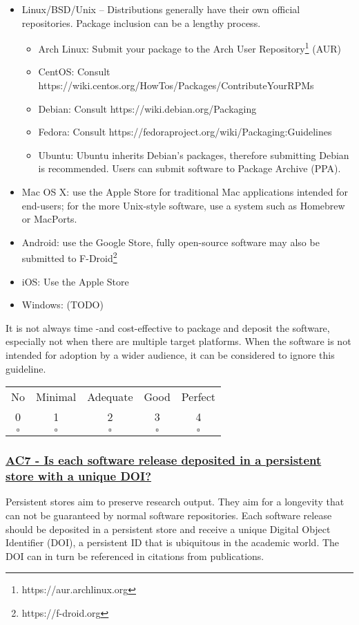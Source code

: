 \documentclass[a4paper,11pt]{article}
\newcommand{\criterion}[2]{\subsubsection*{\underline{#1 - #2}}\label{id:#1}}
\newcommand\CheckTable{%
  \begin{tabular}{ccccc}
    No & Minimal & Adequate & Good & Perfect \\
    0 & 1 & 2 & 3 & 4 \\
    \hline
    $\square$ & $\square$ & $\square$ & $\square$ & $\square$ \\
  \end{tabular}%
}
\begin{document}
\begin{itemize}
    \item Linux/BSD/Unix -- Distributions generally have their own official repositories. Package inclusion can be a lengthy process.
    \begin{itemize}
        \item Arch Linux: Submit your package to the Arch User Repository\footnote{https://aur.archlinux.org} (AUR)
		\item CentOS: Consult https://wiki.centos.org/HowTos/Packages/ContributeYourRPMs
        \item Debian: Consult https://wiki.debian.org/Packaging
        \item Fedora: Consult https://fedoraproject.org/wiki/Packaging:Guidelines
        \item Ubuntu: Ubuntu inherits Debian's packages, therefore submitting Debian is recommended. Users can submit software  to Package Archive (PPA).
    \end{itemize}
    \item Mac OS X: use the Apple Store for traditional Mac applications intended for end-users; for the more Unix-style
        software, use a system such as Homebrew or MacPorts.
    \item Android: use the Google Store, fully open-source software may also be submitted to F-Droid\footnote{https://f-droid.org}
    \item iOS: Use the Apple Store
    \item Windows: (TODO) 
\end{itemize}

It is not always time -and cost-effective to package and deposit the software,
especially not when there are multiple target platforms. When the software is
not intended for adoption by a wider audience, it can be considered to ignore
this guideline.

\CheckTable

\newcommand{\acSevenID}{AC7}
\newcommand{\acSevenText}{Is each software release deposited in a persistent store with a unique DOI?}
\criterion{\acSevenID}{\acSevenText}

Persistent stores aim to preserve research output. They aim for a longevity
that can not be guaranteed by normal software repositories. Each software
release should be deposited in a persistent store and receive a unique Digital
Object Identifier (DOI),  a persistent ID that is ubiquitous in the academic
world. The DOI can in turn be referenced in citations from publications.
\end{document}
